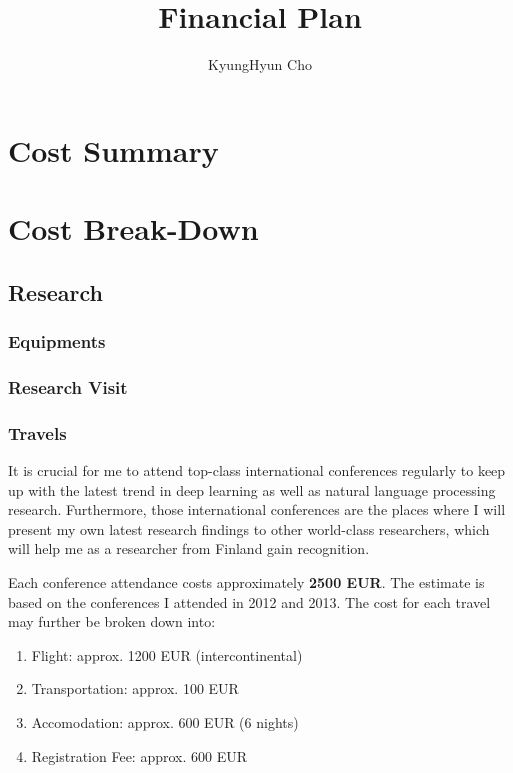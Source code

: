 \documentclass[11pt, oneside]{essay}
\title{Financial Plan}
\author{KyungHyun Cho}
\begin{document}
\maketitle

\section{Cost Summary}



\section{Cost Break-Down}

\subsection{Research}

\subsubsection{Equipments}


\subsubsection{Research Visit}




\subsubsection{Travels}

It is crucial for me to attend top-class international
conferences regularly to keep up with the latest trend in deep
learning as well as natural language processing research.
Furthermore, those international conferences are the places where
I will present my own latest research findings to other
world-class researchers, which will help me as a researcher from
Finland gain recognition.

Each conference attendance costs approximately \textbf{2500 EUR}.
The estimate is based on the conferences I attended in 2012 and
2013. The cost for each travel may further be broken down into:
\begin{enumerate}
    \item Flight: approx. 1200 EUR (intercontinental)
    \item Transportation: approx. 100 EUR
    \item Accomodation: approx. 600 EUR (6 nights)
    \item Registration Fee: approx. 600 EUR
\end{enumerate}
\end{document}
